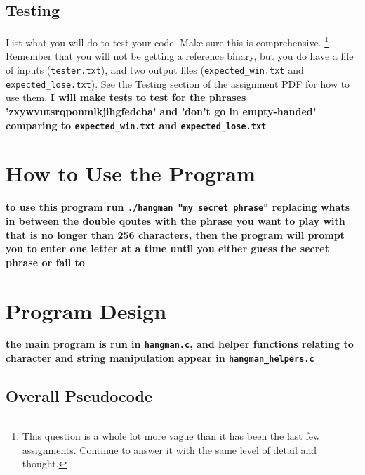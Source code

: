 \documentclass{article}
\begin{document}
\subsection{Testing}
List what you will do to test your code. Make sure this is comprehensive. \footnote{This question is a whole lot more vague than it has been the last few assignments. Continue to answer it with the same level of detail and thought.} Remember that you will not be getting a reference binary,
but you do have a file of inputs (\texttt{tester.txt}), and two output files (\texttt{expected_win.txt} and \texttt{expected_lose.txt}).
See the Testing section of the assignment PDF for how to use them. \textbf{I will make tests to test for the phrases 'zxywvutsrqponmlkjihgfedcba' and 'don't go in empty-handed' comparing to \texttt{expected_win.txt} and \texttt{expected_lose.txt}}


\section{How to Use the Program}

\textbf{to use this program run \lstinline{./hangman "my secret phrase"} replacing whats in between the double qoutes with the phrase you want to play with that is no longer than 256 characters, then the program will prompt you to enter one letter at a time until you either guess the secret phrase or fail to}

\section{Program Design}

\textbf{the main program is run in \lstinline{hangman.c}, and helper functions relating to character and string manipulation appear in \lstinline{hangman_helpers.c}}

\subsection{Overall Pseudocode}
\end{document}
